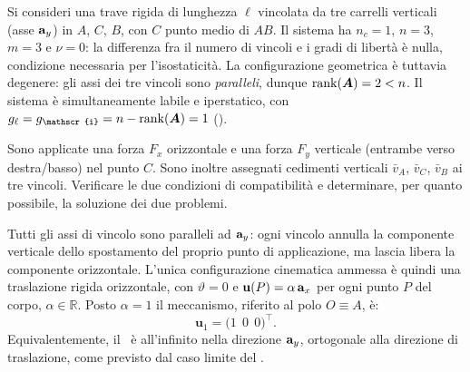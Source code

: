 \begin{esempio}
	\label{ex:labile_iperstatico_3carrelli}
	
	Si consideri una trave rigida di lunghezza $\ell$
	vincolata da tre carrelli verticali (asse $\mathbf{a}_y$) in
	$A$, $C$, $B$, con $C$ punto medio di $AB$. Il sistema
	ha $n_c = 1$, $n = 3$, $m = 3$ e $\nu = 0$: la
	differenza fra il numero di vincoli e i gradi di libertà
	è nulla, condizione necessaria per l'isostaticità. La
	configurazione geometrica è tuttavia degenere: gli assi
	dei tre vincoli sono \emph{paralleli}, dunque
	$\operatorname{rank}(\bm{A}) = 2 < n$. Il sistema è simultaneamente
	labile e iperstatico, con
	$g_\ell = g_{\mathscr{i}} = n - \rg(\bm{A}) = 1$
	().
	
	Sono applicate una forza $F_x$ orizzontale e una forza
	$F_y$ verticale (entrambe verso destra/basso) nel
	punto $C$. Sono inoltre assegnati cedimenti verticali
	$\bar{v}_A$, $\bar{v}_C$, $\bar{v}_B$ ai tre vincoli.
	Verificare le due condizioni di compatibilità e
	determinare, per quanto possibile, la soluzione dei due
	problemi.
	



	
	\begin{svolgimento}
		
		Tutti gli assi di vincolo sono paralleli ad $\mathbf{a}_y$:
		ogni vincolo annulla la componente verticale dello
		spostamento del proprio punto di applicazione, ma
		lascia libera la componente orizzontale. L'unica
		configurazione cinematica ammessa è quindi una
		traslazione rigida orizzontale, con $\vartheta = 0$ e
		$\mathbf{u}(P) = \alpha\,\mathbf{a}_x$ per ogni punto $P$ del corpo,
		$\alpha \in \mathbb{R}$. Posto $\alpha = 1$ il
		meccanismo, riferito al polo $O \equiv A$, è:
		\[
		\bm{u}_1 =
		\bigl(1\,\;0\,\;0\bigr)^{\!\top}.
		\]
		Equivalentemente, il \CRa\ è all'infinito nella
		direzione $\mathbf{a}_y$, ortogonale alla direzione di
		traslazione, come previsto dal caso limite del
		.
		

\end{svolgimento}
\end{esempio}
